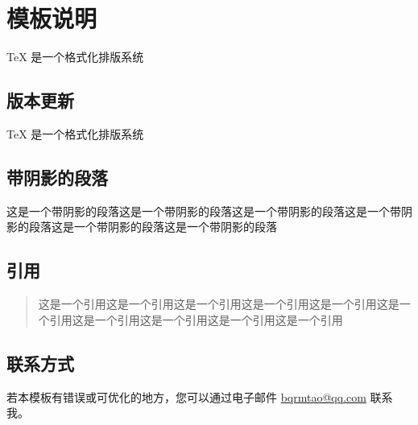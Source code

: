 % 
% 
% 
% 
% 

\chapter{模板说明}
\label{chapter:templateinfo}

\TeX{} \index{\TeX} 是一个格式化排版系统

\section{版本更新}

\TeX{} \index{\TeX} 是一个格式化排版系统

\section{带阴影的段落}
\begin{shaded}
这是一个带阴影的段落这是一个带阴影的段落这是一个带阴影的段落这是一个带阴影的段落这是一个带阴影的段落这是一个带阴影的段落
\end{shaded}

\section{引用}\label{sec:quotation}
\begin{quote}\label{quotation:quote}
这是一个引用这是一个引用这是一个引用这是一个引用这是一个引用这是一个引用这是一个引用这是一个引用这是一个引用这是一个引用
\end{quote}

\section{联系方式}
若本模板有错误或可优化的地方，您可以通过电子邮件 \href{mailto:bqrmtao@qq.com}{bqrmtao@qq.com} 联系我。
